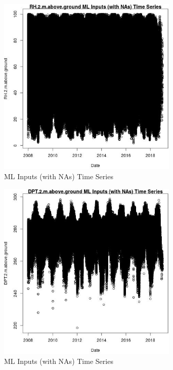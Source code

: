 \begin{figure} 
\centering  
\includegraphics[width=0.77\textwidth]{Code_Outputs/Report_ML_input_PM25_Step4_part_e_de_duplicated_aves_compiled_2019-05-21wNAs_RH2mabovegroundvDate.jpg} 
\caption{\label{fig:Report_ML_input_PM25_Step4_part_e_de_duplicated_aves_compiled_2019-05-21wNAsRH2mabovegroundvDate}ML Inputs (with NAs) Time Series} 
\end{figure} 
 

\begin{figure} 
\centering  
\includegraphics[width=0.77\textwidth]{Code_Outputs/Report_ML_input_PM25_Step4_part_e_de_duplicated_aves_compiled_2019-05-21wNAs_DPT2mabovegroundvDate.jpg} 
\caption{\label{fig:Report_ML_input_PM25_Step4_part_e_de_duplicated_aves_compiled_2019-05-21wNAsDPT2mabovegroundvDate}ML Inputs (with NAs) Time Series} 
\end{figure} 
 


